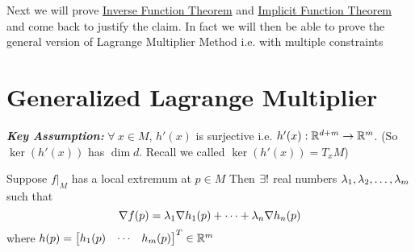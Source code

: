 Next we will prove \hyperref[th:invthm]{Inverse Function Theorem} and \hyperref[th:implicit]{Implicit Function Theorem} and come back to justify the claim. In fact we will then be able to prove the general version of Lagrange Multiplier Method i.e. with multiple constraints

\section{Generalized Lagrange Multiplier}
\parinf

\textbf{\textit{Key Assumption: }}$\forall\ x\in M$, $h'(x)$ is surjective i.e. $h'(x):\mathbb{R}^{d+m}\to \mathbb{R}^m$. (So $\ker(h'(x))$ has $\dim d$. Recall we called $\ker(h'(x))=T_xM$)

Suppose $f|_M$ has a local extremum at $p\in M$ Then $\exists!$ real numbers $\lambda_1,\lambda_2,\dots,\lambda_m$ such that $$\nabla f(p)=\lambda_1\nabla h_1(p)+\cdots+\lambda_n\nabla h_n(p)$$where $h(p)=\left[\begin{matrix}h_1(p) & \cdots & h_m(p)\end{matrix}\right]^T\in \mathbb{R}^m$

